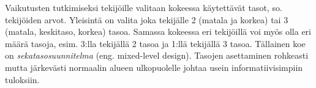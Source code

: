 \documentclass[12pt,a4paper,finnish]{tutthesis}
\begin{document}
Vaikutusten tutkimiseksi tekijöille valitaan kokeessa käytettävät tasot, so.
tekijöiden arvot. Yleisintä on valita joka tekijälle 2 (matala ja korkea) tai
3 (matala, keskitaso, korkea) tasoa.
Samassa kokeessa eri tekijöillä voi myös olla eri määrä tasoja, esim. 3:lla tekijällä
2 tasoa ja 1:llä tekijällä 3 tasoa. Tällainen koe on
\textit{sekatasosuunnitelma} (eng.
mixed-level design).
Tasojen asettaminen rohkeasti mutta
järkevästi normaalin alueen ulkopuolelle johtaa usein informatiivisimpiin
tuloksiin.

%
%
%
\end{document}
